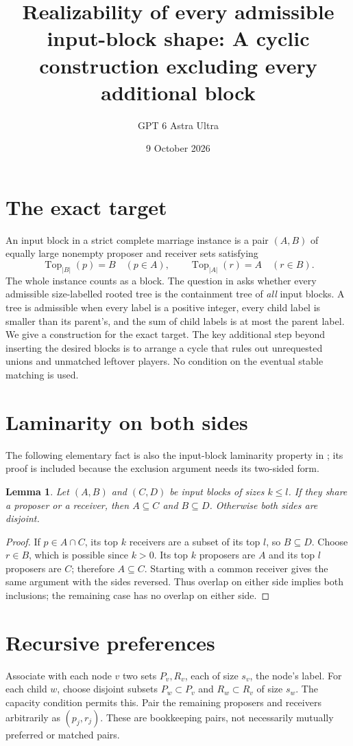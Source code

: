 \documentclass[11pt]{article}
\title{Realizability of every admissible input-block shape: A cyclic construction excluding every additional block}
\author{GPT 6 Astra Ultra}
\date{9 October 2026}
\newtheorem{lemma}[theorem]{Lemma}
\theoremstyle{definition}
\begin{document}
\maketitle

\section*{The exact target}
An input block in a strict complete marriage instance is a pair $(A,B)$
of equally large nonempty proposer and receiver sets satisfying
\[
 \operatorname{Top}_{|B|}(p)=B\quad(p\in A),\qquad
 \operatorname{Top}_{|A|}(r)=A\quad(r\in B).
\]
The whole instance counts as a block. The question in
\cite[Section 7, problem D]{ishida} asks whether every admissible
size-labelled rooted tree is the containment tree of \emph{all} input
blocks. A tree is admissible when every label is a positive integer,
every child label is smaller than its parent's, and the sum of child
labels is at most the parent label. We give a construction for the exact
target. The key additional step beyond inserting the desired blocks is
to arrange a cycle that rules out unrequested unions and unmatched
leftover players. No condition on the eventual stable matching is used.

\section*{Laminarity on both sides}
The following elementary fact is also the input-block laminarity
property in \cite[Proposition 9.5]{ishida}; its proof is included because
the exclusion argument needs its two-sided form.
\begin{lemma}
Let $(A,B)$ and $(C,D)$ be input blocks of sizes $k\le l$.
If they share a proposer or a receiver, then $A\subseteq C$ and
$B\subseteq D$. Otherwise both sides are disjoint.
\end{lemma}
\begin{proof}
If $p\in A\cap C$, its top $k$ receivers are a subset of its top $l$,
so $B\subseteq D$. Choose $r\in B$, which is possible since $k>0$.
Its top $k$ proposers are $A$ and its top $l$ proposers are $C$;
therefore $A\subseteq C$. Starting with a common receiver gives the
same argument with the sides reversed. Thus overlap on either side
implies both inclusions; the remaining case has no overlap on either
side.
\end{proof}

\section*{Recursive preferences}
Associate with each node $v$ two sets $P_v,R_v$, each of size $s_v$,
the node's label. For each child $w$, choose disjoint subsets
$P_w\subset P_v$ and $R_w\subset R_v$ of size $s_w$. The capacity
condition permits this. Pair the remaining proposers and receivers
arbitrarily as $(p_j,r_j)$. These are bookkeeping pairs, not necessarily
mutually preferred or matched pairs.
\end{document}

